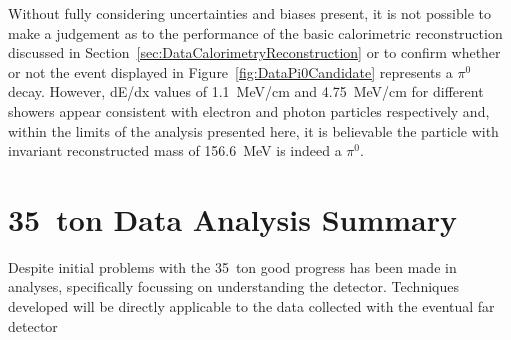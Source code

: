 Without fully considering uncertainties and biases present, it is not possible to make a judgement as to the performance of the basic calorimetric reconstruction discussed in Section~\ref{sec:DataCalorimetryReconstruction} or to confirm whether or not the event displayed in Figure~\ref{fig:DataPi0Candidate} represents a $\pi^0$ decay.  However, dE/dx values of 1.1~MeV/cm and 4.75~MeV/cm for different showers appear consistent with electron and photon particles respectively and, within the limits of the analysis presented here, it is believable the particle with invariant reconstructed mass of 156.6~MeV is indeed a $\pi^0$.

\section{35~ton Data Analysis Summary}\label{sec:35tonDataSummary}

Despite initial problems with the 35~ton good progress has been made in analyses, specifically focussing on understanding the detector.  Techniques developed will be directly applicable to the data collected with the eventual far detector
